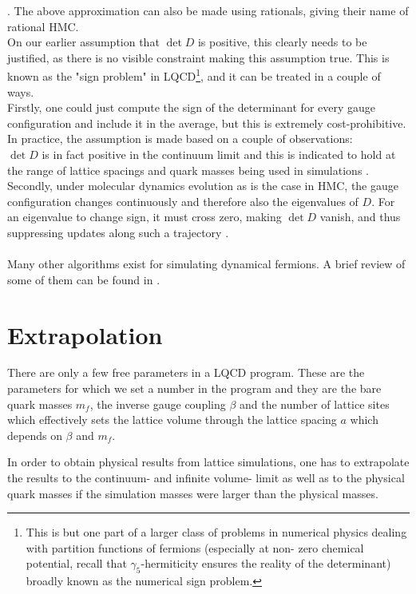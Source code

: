 \documentclass[a4paper,10pt]{book}
\begin{document}
\cite{BORICI1995645}. The above approximation can also be made using rationals, giving their name of rational HMC.\\On our earlier assumption that $\operatorname{det}D$ is positive, this clearly needs to be justified, as there is no visible constraint making this assumption true. This is known as the "sign problem" in LQCD\footnote{This is but one part of a larger class of problems in numerical physics dealing with partition functions of fermions (especially at non- zero chemical potential, recall that $\gamma_5$-hermiticity ensures the reality of the determinant) broadly known as the numerical sign problem.}, and it can be treated in a couple of ways.\\Firstly, one could just compute the sign of the determinant for every gauge configuration and include it in the average, but this is extremely cost-prohibitive.\\In practice, the assumption is made based on a couple of observations:\\$\operatorname{det}D$ is in fact positive in the continuum limit and this is indicated to hold at the range of lattice spacings and quark masses being used in simulations \cite{BORICI1995645}\cite{Zyla:2020zbs}.\\Secondly, under molecular dynamics evolution as is the case in HMC, the gauge configuration changes continuously and therefore also the eigenvalues of $D$. For an eigenvalue to change sign, it must cross zero, making $\operatorname{det}D$ vanish, and thus suppressing updates along such a trajectory \cite{JLQCD:2001ucs}.\\\\Many other algorithms exist for simulating dynamical fermions. A brief review of some of them can be found in \cite{schaefer2012status}.
\section{Extrapolation}
There are only a few free parameters in a LQCD program. These are the parameters for which we set a number in the program and they are the bare quark masses $m_f$, the inverse gauge coupling $\beta$ and the number of lattice sites which effectively sets the lattice volume through the lattice spacing $a$ which depends on $\beta$ and $m_f$.\par In order to obtain physical results from lattice simulations, one has to extrapolate the results to the continuum- and infinite volume- limit as well as to the physical quark masses if the simulation masses were larger than the physical masses.  
\end{document}
